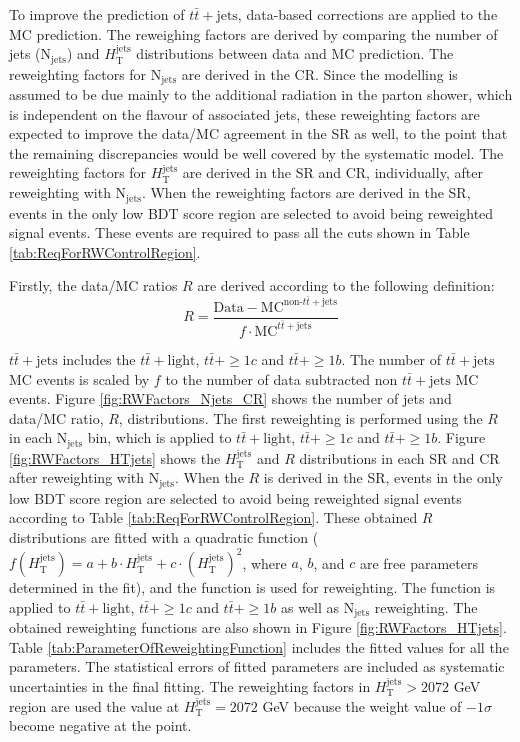 To improve the prediction of $t\bar{t}+\text{jets}$, data-based corrections are applied to the MC prediction. The reweighing factors are derived by comparing the number of jets ($\text{N}_{\text{jets}}$) and $H_{\text{T}}^{\text{jets}}$ distributions between data and MC prediction. The reweighting factors for $\text{N}_{\text{jets}}$ are derived in the CR. Since the modelling is assumed to be due mainly to the additional radiation in the parton shower, which is independent on the flavour of associated jets, these reweighting factors are expected to improve the data/MC agreement in the SR as well, to the point that the remaining discrepancies would be well covered by the systematic model. The reweighting factors for $H_{\text{T}}^{\text{jets}}$ are derived in the SR and CR, individually, after reweighting with $\text{N}_{\text{jets}}$. When the reweighting factors are derived in the SR, events in the only low BDT score region are selected to avoid being reweighted signal events. These events are required to pass all the cuts shown in Table \ref{tab:ReqForRWControlRegion}. 

Firstly, the data/MC ratios $R$ are derived according to the following definition:
\begin{equation}
  R = \frac{\text{Data}-\text{MC}^{\text{non-}t\bar{t}+\text{jets}}}{f \cdot \text{MC}^{t\bar{t}+\text{jets}}}
\end{equation}

$t\bar{t}+\text{jets}$ includes the $t\bar{t}+\text{light}$, $t\bar{t}+\geq1c$ and $t\bar{t}+\geq1b$. The number of $t\bar{t}+\text{jets}$ MC events is scaled by $f$ to the number of data subtracted non $t\bar{t}+\text{jets}$ MC events. Figure \ref{fig:RWFactors_Njets_CR} shows the number of jets and data/MC ratio, $R$, distributions. The first reweighting is performed using the $R$ in each $\text{N}_{\text{jets}}$ bin, which is applied to $t\bar{t}+\text{light}$, $t\bar{t}+\geq1c$ and $t\bar{t}+\geq1b$. Figure \ref{fig:RWFactors_HTjets} shows the $H_{\text{T}}^{\text{jets}}$ and $R$ distributions in each SR and CR after reweighting with $\text{N}_{\text{jets}}$. When the $R$ is derived in the SR, events in the only low BDT score region are selected to avoid being reweighted signal events according to Table \ref{tab:ReqForRWControlRegion}. These obtained $R$ distributions are fitted with a quadratic function ($f(H_{\text{T}}^{\text{jets}}) = a + b \cdot H_{\text{T}}^{\text{jets}} + c \cdot (H_{\text{T}}^{\text{jets}})^{2}$, where $a$, $b$, and $c$ are free parameters determined in the fit), and the function is used for reweighting. The function is applied to $t\bar{t}+\text{light}$, $t\bar{t}+\geq1c$ and $t\bar{t}+\geq1b$ as well as $\text{N}_{\text{jets}}$ reweighting. The obtained reweighting functions are also shown in Figure \ref{fig:RWFactors_HTjets}. Table \ref{tab:ParameterOfReweightingFunction} includes the fitted values for all the parameters. The statistical errors of fitted parameters are included as systematic uncertainties in the final fitting. The reweighting factors in $H_{\text{T}}^{\text{jets}}>2072$ GeV region are used the value at $H_{\text{T}}^{\text{jets}}=2072$ GeV because the weight value of $-1\sigma$ become negative at the point.

